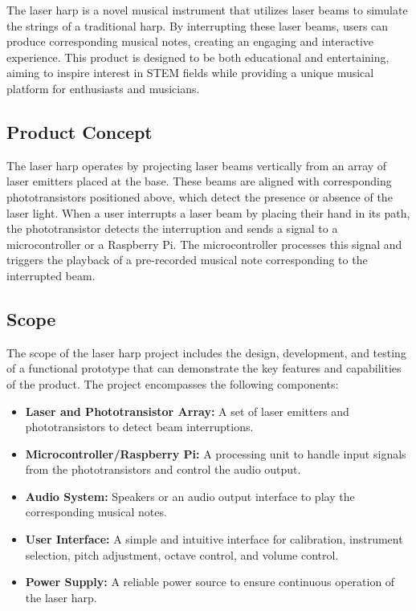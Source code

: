 The laser harp is a novel musical instrument that utilizes laser beams to simulate the strings of a traditional harp. By interrupting these laser beams, users can produce corresponding musical notes, creating an engaging and interactive experience. This product is designed to be both educational and entertaining, aiming to inspire interest in STEM fields while providing a unique musical platform for enthusiasts and musicians.

\subsection{Product Concept}

The laser harp operates by projecting laser beams vertically from an array of laser emitters placed at the base. These beams are aligned with corresponding phototransistors positioned above, which detect the presence or absence of the laser light. When a user interrupts a laser beam by placing their hand in its path, the phototransistor detects the interruption and sends a signal to a microcontroller or a Raspberry Pi. The microcontroller processes this signal and triggers the playback of a pre-recorded musical note corresponding to the interrupted beam.

\subsection{Scope}

The scope of the laser harp project includes the design, development, and testing of a functional prototype that can demonstrate the key features and capabilities of the product. The project encompasses the following components:
\begin{itemize}
    \item \textbf{Laser and Phototransistor Array:} A set of laser emitters and phototransistors to detect beam interruptions.
    \item \textbf{Microcontroller/Raspberry Pi:} A processing unit to handle input signals from the phototransistors and control the audio output.
    \item \textbf{Audio System:} Speakers or an audio output interface to play the corresponding musical notes.
    \item \textbf{User Interface:} A simple and intuitive interface for calibration, instrument selection, pitch adjustment, octave control, and volume control.
    \item \textbf{Power Supply:} A reliable power source to ensure continuous operation of the laser harp.
\end{itemize}

